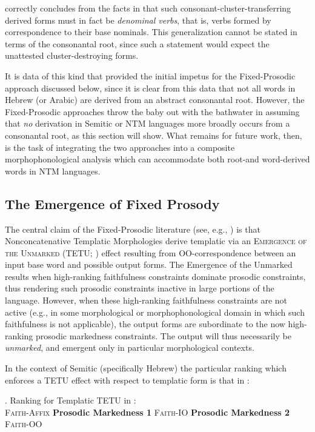 \documentclass[12pt,twoside,letterpaper]{article}
\begin{document}
\cite{batel94} correctly concludes from the facts in \Last that such consonant-cluster-transferring derived forms must in fact be \emph{denominal verbs}, that is, verbs formed by correspondence to their base nominals. This generalization cannot be stated in terms of the consonantal root, since such a statement would expect the unattested cluster-destroying forms.

It is data of this kind that provided the initial impetus for the Fixed-Prosodic approach discussed below, since it is clear from this data that not all words in Hebrew (or Arabic) are derived from an abstract consonantal root. However, the Fixed-Prosodic approaches throw the baby out with the bathwater in assuming that \emph{no} derivation in Semitic or NTM languages more broadly occurs from a consonantal root, as this section will show. What remains for future work, then, is the task of integrating the two approaches into a composite morphophonological analysis which can accommodate both root-and word-derived words in NTM languages.


\subsection{The Emergence of Fixed Prosody}
\label{sec:emerg-fixed-pros}

The central claim of the Fixed-Prosodic literature (see, e.g., \cite[pp.210-3]{ussishkin05}) is that Nonconcatenative Templatic Morphologies derive templatic via an \textsc{Emergence of the Unmarked} (TETU; \cite{mccarthy94}) effect resulting from OO-correspondence between an input base word and possible output forms. The Emergence of the Unmarked results when high-ranking faithfulness constraints dominate prosodic constraints, thus rendering such prosodic constraints inactive in large portions of the language. However, when these high-ranking faithfulness constraints are not active (e.g., in some morphological or morphophonological domain in which such faithfulness is not applicable), the output forms are subordinate to the now high-ranking prosodic markedness constraints. The output will thus necessarily be \emph{unmarked}, and emergent only in particular morphological contexts.

In the context of Semitic (specifically Hebrew) the particular ranking which enforces a TETU effect with respect to templatic form is that in \Next:

\ex. Ranking for Templatic TETU in \cite[p.211]{ussishkin05}:\\\textsc{Faith-Affix} \OTdom \textbf{Prosodic Markedness 1} \OTdom \textsc{Faith-IO} \OTdom \textbf{Prosodic Markedness 2} \OTdom \textsc{Faith-OO}
\end{document}
